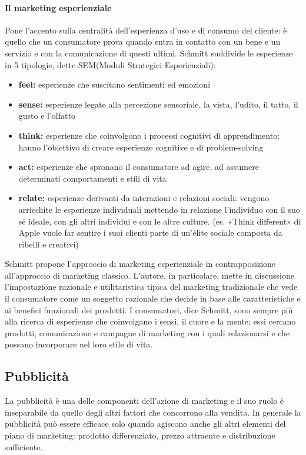 \paragraph{Il marketing esperienziale} Pone l’accento sulla centralità dell'esperienza d’uso e di consumo del cliente: è quello che un consumatore prova quando entra in contatto con un bene e un servizio e con la comunicazione di questi ultimi. 
Schmitt suddivide le esperienze in 5 tipologie, dette SEM(Moduli Strategici Esperienziali): 
\begin{itemize}
	\item \textbf{feel:} esperienze che suscitano sentimenti ed emozioni
	\item  \textbf{sense:} esperienze legate alla percezione sensoriale, la vista, l’udito, il tatto, il gusto e l’olfatto
	\item  \textbf{think:} esperienze che coinvolgono i processi cognitivi di apprendimento: hanno l’obiettivo di creare esperienze cognitive e di problem-solving
	\item  \textbf{act:} esperienze che spronano il consumatore ad agire, ad assumere determinati comportamenti e stili di vita
	\item  \textbf{relate:} esperienze derivanti da interazioni e relazioni sociali: vengono arricchite le esperienze individuali mettendo in relazione l’individuo con il suo sé ideale, con gli altri individui e con le altre culture. (es. «Think different» di Apple vuole far sentire i suoi clienti parte di un’élite sociale composta da ribelli e creativi)
\end{itemize}
Schmitt propone l’approccio di marketing esperienziale in
contrapposizione all’approccio di marketing classico.
L’autore, in particolare, mette in discussione l’impostazione razionale e utilitaristica tipica del marketing tradizionale che vede il consumatore come un soggetto razionale che decide in base alle caratteristiche e ai benefici funzionali dei prodotti. I consumatori, dice Schmitt, sono sempre più alla ricerca di esperienze che coinvolgano i sensi, il cuore e la mente; essi cercano prodotti, comunicazione e campagne di marketing con i quali relazionarsi e che possano incorporare nel loro stile di vita.

\subsection{Pubblicità}
La pubblicità è una delle componenti dell'azione di
marketing e il suo ruolo è inseparabile da quello degli altri fattori che concorrono alla vendita. In generale la pubblicità può essere efficace solo quando agiscono anche gli altri elementi del piano di marketing: prodotto differenziato, prezzo attraente e distribuzione sufficiente.

